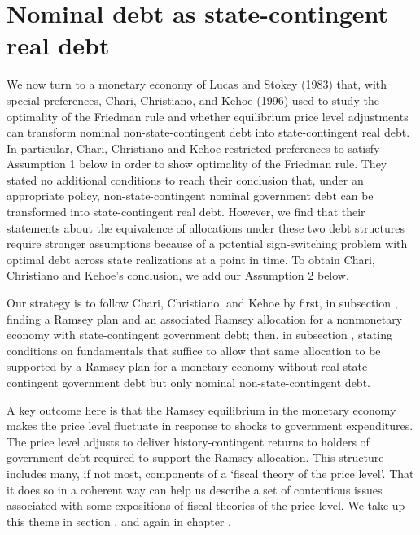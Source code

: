\section{Nominal debt  as
state-contingent real debt}\label{sec:nom_into_real}%
We now turn to a monetary economy of Lucas and Stokey (1983) that, with special  preferences,
Chari, Christiano, and Kehoe (1996)  used to study the optimality of the
Friedman rule and whether  equilibrium price level adjustments can transform nominal
non-state-contingent debt into state-contingent real debt.
In particular,  Chari, Christiano and Kehoe restricted preferences to satisfy  Assumption 1 below in order to  show optimality of the Friedman rule.
They stated no additional conditions to reach their conclusion that, under an appropriate policy,  non-state-contingent nominal government debt can be transformed into
   state-contingent real debt.  However, we find that their statements about the equivalence of allocations under these two debt structures  require stronger assumptions  because of a potential  sign-switching problem with  optimal debt across state realizations at a point in time. To obtain Chari, Christiano and Kehoe's conclusion,  we add our  Assumption 2 below. %
%
%

Our strategy is to follow Chari, Christiano, and Kehoe by first, in subsection ,  finding a Ramsey plan and an associated Ramsey allocation for a nonmonetary
economy with state-contingent government debt; then, in subsection ,  stating  conditions on fundamentals that suffice to allow that  same allocation to  be supported by a Ramsey plan for
a monetary economy without real state-contingent government debt but only nominal non-state-contingent debt.

A key outcome here is that the Ramsey equilibrium in the monetary economy makes
the price level fluctuate in response to  shocks to government expenditures. The price level adjusts  to deliver history-contingent returns to
holders of government debt required to support the Ramsey allocation.      %
This structure includes many, if not most, components of  a `fiscal theory of the price level'. That it does so in a coherent way  can help us describe a set of contentious
  issues associated with some expositions of fiscal  theories of the price level.   We take up this theme in section , and again in
chapter .
%

